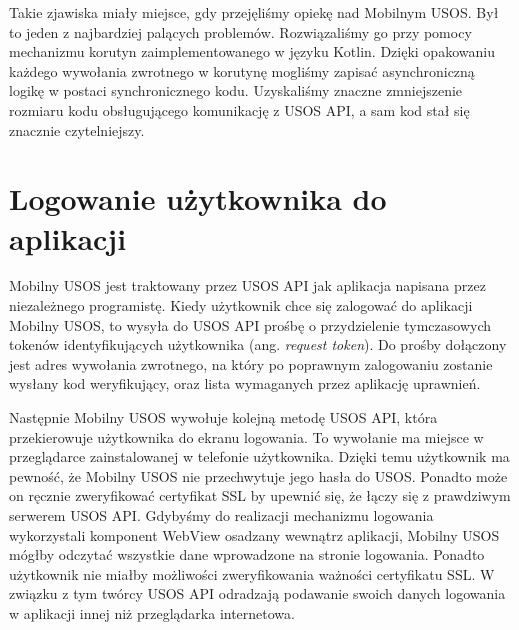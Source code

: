 \documentclass{pracamgr}
\begin{document}
Takie zjawiska miały miejsce, gdy przejęliśmy opiekę nad Mobilnym USOS. Był to
jeden z najbardziej palących problemów. Rozwiązaliśmy go przy pomocy mechanizmu
korutyn zaimplementowanego w języku Kotlin. Dzięki opakowaniu każdego wywołania
zwrotnego w korutynę mogliśmy zapisać asynchroniczną logikę w postaci synchronicznego
kodu. Uzyskaliśmy znaczne zmniejszenie rozmiaru kodu obsługującego komunikację z
USOS API, a sam kod stał się znacznie czytelniejszy.

\section{Logowanie użytkownika do aplikacji}

Mobilny USOS jest traktowany przez USOS API jak aplikacja napisana przez niezależnego
programistę. Kiedy użytkownik chce się zalogować do aplikacji Mobilny USOS, to wysyła
do USOS API prośbę o przydzielenie tymczasowych tokenów identyfikujących użytkownika
(ang. \textit{request token}). Do prośby dołączony jest adres wywołania zwrotnego,
na który po poprawnym zalogowaniu zostanie wysłany kod weryfikujący, oraz lista
wymaganych przez aplikację uprawnień.

Następnie Mobilny USOS wywołuje kolejną metodę USOS API, która przekierowuje
użytkownika do ekranu logowania. To wywołanie ma miejsce w przeglądarce zainstalowanej
w telefonie użytkownika. Dzięki temu użytkownik ma pewność, że Mobilny USOS nie
przechwytuje jego hasła do USOS. Ponadto może on ręcznie zweryfikować certyfikat SSL
by upewnić się, że łączy się z prawdziwym serwerem USOS API. Gdybyśmy do realizacji
mechanizmu logowania wykorzystali komponent WebView osadzany wewnątrz aplikacji,
Mobilny USOS mógłby odczytać wszystkie dane wprowadzone na stronie logowania.
Ponadto użytkownik nie miałby możliwości zweryfikowania ważności certyfikatu SSL.
W związku z tym twórcy USOS API odradzają podawanie swoich danych logowania w
aplikacji innej niż przeglądarka internetowa.
\end{document}
